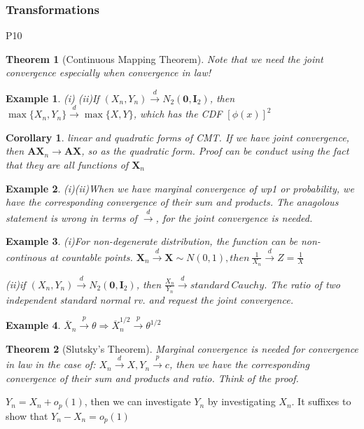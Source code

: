 \documentclass{ctexart}
\newtheorem{theorem}{Theorem}[subsection]
\newtheorem{corollary}{Corollary}[subsection]
\newtheorem{example}{Example}[subsection]
\begin{document}
\subsubsection{Transformations}
P10
\begin{theorem}[Continuous Mapping Theorem]
  Note that we need the joint convergence especially when convergence in law!
\end{theorem}
\begin{example}
  (i)
  (ii)If \((X_n,Y_n)\xrightarrow{d}N_2(\boldsymbol{0},\boldsymbol{I}_2)\), then \(\max\{X_n,Y_n\} \xrightarrow{d}\max\{X,Y\}\), which has the CDF \([\phi(x)]^2\)   
\end{example}
\begin{corollary}
  linear and quadratic forms of CMT. If we have joint convergence, then \(\boldsymbol{A}\boldsymbol{X}_n\to \boldsymbol{A}\boldsymbol{X}\), so as the quadratic form. Proof can be conduct using the fact that they are all functions of \(\boldsymbol{X}_n\)  
\end{corollary}
\begin{example}
  (i)(ii)When we have marginal convergence of wp1 or probability, we have the corresponding convergence of their sum and products. The anagolous statement is wrong in terms of \(\xrightarrow{d}\), for the joint convergence is needed.
\end{example}
\begin{example}
  (i)For non-degenerate distribution, the function can be non-continous at countable points. \(\boldsymbol{X}_n \xrightarrow{d}\boldsymbol{X}\sim N(0,1),then\  \frac{1}{X_n}\xrightarrow{d}Z=\frac{1}{X}\) 
  
  (ii)if \((X_n,Y_n)\xrightarrow{d}N_2(\boldsymbol{0},\boldsymbol{I}_2)\), then \(\frac{X_n}{Y_n}\xrightarrow{d}standard\ Cauchy\). The ratio of two independent standard normal rv. and request the joint convergence. 
\end{example}
\begin{example}
  \(\overline{X}_n \xrightarrow{p}\theta \Rightarrow \overline{X}_n^{1/2} \xrightarrow{p}\theta^{1/2}\) 
\end{example}

\begin{theorem}[Slutsky's Theorem]
  Marginal convergence is needed for convergence in law in the case of: \(X_n \xrightarrow{d}X, Y_n \xrightarrow{p}c\), then we have the corresponding convergence of their sum and products and ratio. Think of the proof. 
\end{theorem}
\(Y_n=X_n+o_p(1)\), then we can investigate \(Y_n\) by investigating \(X_n\). It suffixes to show that \(Y_n-X_n=o_p(1)\) 
\end{document}
